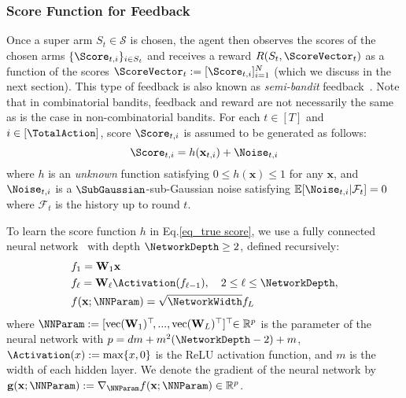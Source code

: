 \documentclass{article}
\theoremstyle{plain}
\begin{document}
\subsubsection{Score Function for Feedback} \label{subsec: subscore function}
Once a super arm $S_t \in \mathcal{S}$ is chosen, 
the agent then observes the scores of the chosen arms $\{ \Score_{t,i} \}_{i \in S_t}$ 
and receives a reward $R(S_t, \ScoreVector_t)$ as a function of the scores $\ScoreVector_t := [ \Score_{t,i} ]_{i=1}^N$ (which we discuss in the next section). 
This type of feedback is also known as {\it semi-bandit} feedback~\citep{audibert2014regret}. 
Note that in combinatorial bandits,
feedback and reward are not necessarily the same
as is the case in non-combinatorial bandits.
For each $t \in [T]$ and $i \in [\TotalAction]$, score $\Score_{t, i}$ is assumed to be generated as follows:
\begin{equation}\label{eq_true score}
    \Score_{t, i} = h(\mathbf{x}_{t,i}) + \Noise_{t,i}
\end{equation}
where $h$ is an {\it unknown} function satisfying $0 \le h(\mathbf{x}) \le 1$ for any  $\mathbf{x}$, and $\Noise_{t,i}$ is a $\SubGaussian$-sub-Gaussian noise satisfying $\mathbb{E}[\Noise_{t,i}| \mathcal{F}_t] = 0$ where $\mathcal{F}_t$ is the history up to round $t$. 

To learn the score function $h$ in Eq.\eqref{eq_true score}, we use a fully connected neural network~\cite{zhou2020neural, zhang2021neural}
with depth $\NetworkDepth \ge 2$, defined recursively:
\begin{equation}\label{DNN f}
\begin{split}
& f_1 = \mathbf{W}_1 \mathbf{x}\\
& f_\ell = \mathbf{W}_\ell \Activation(f_{\ell-1}), \quad 2 \le \ell \le \NetworkDepth, \\
& f(\mathbf{x} ; \NNParam) = \sqrt{\NetworkWidth} f_L
\end{split}
\end{equation}
where $\NNParam := [ \text{vec}(\mathbf{W}_1)^\top\!, ...,\text{vec}(\mathbf{W}_L)^\top ]^\top\!\!\in \mathbb{R}^p$ is the parameter of the neural network with $p=dm + m^2(\NetworkDepth-2) + m$, $\Activation(x):= \text{max}\{x, 0\}$ is the ReLU activation function, and $m$ is the width of each hidden layer. We denote the gradient of the neural network by $\mathbf{g}(\mathbf{x};\NNParam) := \nabla_{\NNParam} f(\mathbf{x};\NNParam) \in \mathbb{R}^p$.

\end{document}
